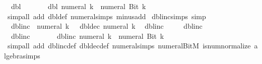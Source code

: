 \begin{isabellebody}
\ \ {\isachardoublequoteopen}dbl\ {\isacharparenleft}{\kern0pt}{\isacharminus}{\kern0pt}\ {}{\isacharparenright}{\kern0pt}\ {\isacharequal}{\kern0pt}\ {\isacharminus}{\kern0pt}\ {}{\isachardoublequoteclose}\isanewline
\ \ {\isachardoublequoteopen}dbl\ {\isacharparenleft}{\kern0pt}numeral\ k{\isacharparenright}{\kern0pt}\ {\isacharequal}{\kern0pt}\ numeral\ {\isacharparenleft}{\kern0pt}Bit{}\ k{\isacharparenright}{\kern0pt}{\isachardoublequoteclose}\isanewline
%
\isadelimproof
\ \ %
\endisadelimproof
%
\isatagproof
{}\isamarkupfalse%
\ {\isacharparenleft}{\kern0pt}simp{\isacharunderscore}{\kern0pt}all\ add{\isacharcolon}{\kern0pt}\ dbl{\isacharunderscore}{\kern0pt}def\ numeral{\isachardot}{\kern0pt}simps\ minus{\isacharunderscore}{\kern0pt}add{\isacharparenright}{\kern0pt}%
\endisatagproof
{\isafoldproof}%
%
\isadelimproof
\isanewline
%
\endisadelimproof
\isanewline
{}\isamarkupfalse%
\ dbl{\isacharunderscore}{\kern0pt}inc{\isacharunderscore}{\kern0pt}simps\ {\isacharbrackleft}{\kern0pt}simp{\isacharbrackright}{\kern0pt}{\isacharcolon}{\kern0pt}\isanewline
\ \ {\isachardoublequoteopen}dbl{\isacharunderscore}{\kern0pt}inc\ {\isacharparenleft}{\kern0pt}{\isacharminus}{\kern0pt}\ numeral\ k{\isacharparenright}{\kern0pt}\ {\isacharequal}{\kern0pt}\ {\isacharminus}{\kern0pt}\ dbl{\isacharunderscore}{\kern0pt}dec\ {\isacharparenleft}{\kern0pt}numeral\ k{\isacharparenright}{\kern0pt}{\isachardoublequoteclose}\isanewline
\ \ {\isachardoublequoteopen}dbl{\isacharunderscore}{\kern0pt}inc\ {}\ {\isacharequal}{\kern0pt}\ {}{\isachardoublequoteclose}\isanewline
\ \ {\isachardoublequoteopen}dbl{\isacharunderscore}{\kern0pt}inc\ {}\ {\isacharequal}{\kern0pt}\ {}{\isachardoublequoteclose}\isanewline
\ \ {\isachardoublequoteopen}dbl{\isacharunderscore}{\kern0pt}inc\ {\isacharparenleft}{\kern0pt}{\isacharminus}{\kern0pt}\ {}{\isacharparenright}{\kern0pt}\ {\isacharequal}{\kern0pt}\ {\isacharminus}{\kern0pt}\ {}{\isachardoublequoteclose}\isanewline
\ \ {\isachardoublequoteopen}dbl{\isacharunderscore}{\kern0pt}inc\ {\isacharparenleft}{\kern0pt}numeral\ k{\isacharparenright}{\kern0pt}\ {\isacharequal}{\kern0pt}\ numeral\ {\isacharparenleft}{\kern0pt}Bit{}\ k{\isacharparenright}{\kern0pt}{\isachardoublequoteclose}\isanewline
%
\isadelimproof
\ \ %
\endisadelimproof
%
\isatagproof
{}\isamarkupfalse%
\ {\isacharparenleft}{\kern0pt}simp{\isacharunderscore}{\kern0pt}all\ add{\isacharcolon}{\kern0pt}\ dbl{\isacharunderscore}{\kern0pt}inc{\isacharunderscore}{\kern0pt}def\ dbl{\isacharunderscore}{\kern0pt}dec{\isacharunderscore}{\kern0pt}def\ numeral{\isachardot}{\kern0pt}simps\ numeral{\isacharunderscore}{\kern0pt}BitM\ is{\isacharunderscore}{\kern0pt}num{\isacharunderscore}{\kern0pt}normalize\ algebra{\isacharunderscore}{\kern0pt}simps\isanewline

\end{isabellebody}
